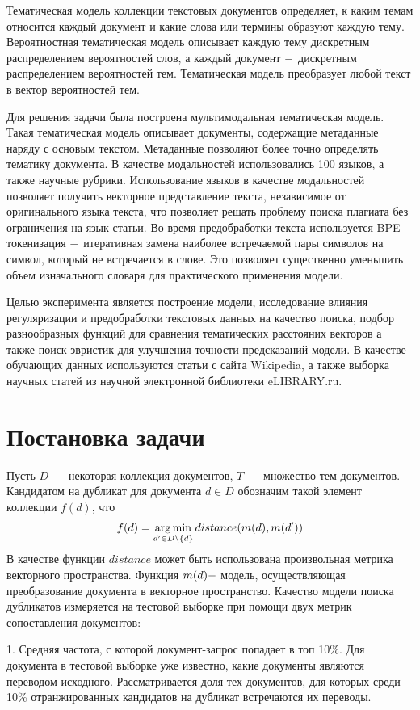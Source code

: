 \documentclass[12pt, twoside]{article}
\begin{document}
Тематическая модель коллекции текстовых документов определяет, к каким темам относится каждый документ и какие слова или термины образуют каждую тему. Вероятностная тематическая модель описывает каждую тему дискретным распределением вероятностей слов, а каждый документ $\--$ дискретным распределением вероятностей тем. Тематическая модель преобразует любой текст в вектор вероятностей тем. 

Для решения задачи была построена мультимодальная тематическая модель. Такая тематическая модель описывает документы, содержащие метаданные наряду с основым текстом. Метаданные позволяют более точно определять тематику документа. В качестве модальностей использовались 100 языков, а также научные рубрики. Использование языков в качестве модальностей позволяет получить векторное представление текста, независимое от оригинального языка текста, что позволяет решать проблему поиска плагиата без ограничения на язык статьи. Во время предобработки текста используется BPE токенизация $\--$ итеративная замена наиболее встречаемой пары символов на символ, который не встречается в слове. Это позволяет существенно уменьшить объем изначального словаря для практического применения модели.

Целью эксперимента является построение модели, исследование влияния регуляризации и предобработки текстовых данных на качество поиска, подбор разнообразных функций для сравнения тематических расстояних векторов а также поиск эвристик для улучшения точности предсказаний модели. В качестве обучающих данных используются статьи с сайта Wikipedia, а также выборка научных статей из научной электронной библиотеки eLIBRARY.ru.

\section{Постановка задачи}

Пусть $D~-$ некоторая коллекция документов, $T~-$ множество тем документов. Кандидатом на дубликат  для документа $d \in D$ обозначим такой элемент коллекции $f(d)$, что  $$f(d) = \argmin_{d' \in D \setminus \{d\}} distance(m(d), m(d'))$$ 
В качестве функции $distance$ может быть использована произвольная метрика векторного пространства. Функция  $m(d) \--$ модель, осуществляющая преобразование документа в векторное пространство. Качество модели поиска дубликатов измеряется на тестовой выборке при помощи двух метрик сопоставления документов:

1. Средняя частота, с которой документ-запрос попадает в топ 10\%.  Для документа в тестовой выборке уже известно, какие документы являются переводом исходного. Рассматривается доля тех документов, для которых среди 10\% отранжированных кандидатов на дубликат встречаются их переводы. 
\end{document}

